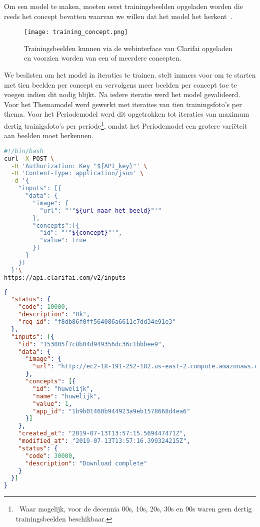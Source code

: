 Om een model te maken, moeten eerst trainingsbeelden opgeladen worden die reeds het concept bevatten waarvan we willen dat het model het herkent~\autocite{ClarifaiAPI}. 

\begin{figure}[h]
	\centering
	\texttt{[image: training\_concept.png]}\hfill
	\caption[Trainingsbeelden toevoegen via de webinterface]{Trainingsbeelden kunnen via de webinterface van Clarifai opgeladen en voorzien worden van een of meerdere concepten.}
	\label{fig:trainingsbeelden-toevoegen}
\end{figure}

We beslisten om het model in iteraties te trainen. \textcite{ClarifaiAPI} stelt immers voor om te starten met tien beelden per concept en vervolgens meer beelden per concept toe te voegen indien dit nodig blijkt. Na iedere iteratie werd het model gevalideerd. Voor het Themamodel werd gewerkt met iteraties van tien trainingsfoto’s per thema. Voor het Periodemodel werd dit opgetrokken tot iteraties van maximum dertig trainigsfoto’s per periode\footnote{~Waar mogelijk, voor de decennia 00s, 10s, 20s, 30s en 90s waren geen dertig trainingsbeelden beschikbaar.}, omdat het Periodemodel een grotere variëteit aan beelden moet herkennen.

\begin{lstlisting}[language=bash,caption={Bash commando om een beeld met een concept naar Clarifai op te laden.}]
#!/bin/bash
curl -X POST \
  -H 'Authorization: Key "${API_key}"' \
  -H 'Content-Type: application/json' \
  -d '{
    "inputs": [{
      "data": {
        "image": {
          "url": "'"${url_naar_het_beeld}"'"
        },
        "concepts":[{
          "id": "'"${concept}"'",
          "value": true
        }]
      }
    }]
  }'\
https://api.clarifai.com/v2/inputs
\end{lstlisting}

\begin{lstlisting}[language=json,caption={Het antwoord van de CV API na het opladen van een beeld met een concept}]
{
  "status": {
    "code": 10000,
    "description": "Ok",
    "req_id": "f8db86f0ff564086a6611c7dd34e91e3"
  },
  "inputs": [{
    "id": "153005f7c8b04d949356dc36c1bbbee9",
    "data": {
      "image": {
        "url": "http://ec2-18-191-252-182.us-east-2.compute.amazonaws.com:8182/iiif/2/2003-036-018/full/922,/0/default.jpg"
      },
      "concepts": [{
        "id": "huwelijk",
        "name": "huwelijk",
        "value": 1,
        "app_id": "1b9b01460b944923a9eb1578668d4ea6"
      }]
    },
    "created_at": "2019-07-13T13:57:15.569447471Z",
    "modified_at": "2019-07-13T13:57:16.399324215Z",
    "status": {
      "code": 30000,
      "description": "Download complete"
    }
  }]
}
\end{lstlisting}


